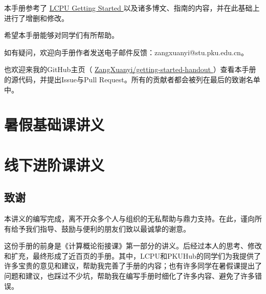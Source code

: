\documentclass[12pt, openany]{book}
\let\oldhref\href
\renewcommand{\href}[2]{%
  \oldhref{#1}{%
    \color{blue}\underline{#2}%
    \raisebox{0.2ex}{\tiny$\nearrow$}%
  }%
}
\begin{document}
本手册参考了\href{https://missing.lcpu.dev}{LCPU Getting Started}以及诸多博文、指南的内容，并在此基础上进行了增删和修改。

希望本手册能够对同学们有所帮助。

如有疑问，欢迎向手册作者发送电子邮件反馈：zangxuanyi@stu.pku.edu.cn。

也欢迎来我的GitHub主页（\faGithub\href{https://github.com/ZangXuanyi/getting-started-handout}{ZangXuanyi/getting-started-handout}）查看本手册的源代码，并提出Issue与Pull Request。所有的贡献者都会被列在最后的致谢名单中。

\mainmatter

\tableofcontents


\part{暑假基础课讲义}









\part{线下进阶课讲义}









\backmatter

\chapter{致谢}

本讲义的编写完成，离不开众多个人与组织的无私帮助与鼎力支持。在此，谨向所有给予我们指导、鼓励与便利的朋友们致以最诚挚的谢意。

这份手册的前身是《计算概论衔接课》第一部分的讲义。后经过本人的思考、修改和扩充，最终形成了近百页的手册。其中，LCPU和PKUHub的同学们为我提供了许多宝贵的意见和建议，帮助我完善了手册的内容；也有许多同学在暑假课提出了问题和建议，也踩过不少坑，帮助我在编写手册时细化了许多内容、避免了许多错误。
\end{document}
